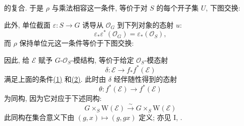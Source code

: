 的复合. 于是 \(\rho\) 与乘法相容这一条件,
等价于对 \(S\) 的每个开子集 \(U\), 下图交换:
\begin{center}
  \label{diag:sga3-VIB-11.6-1}%
  {\scriptsize
  }
\end{center}
此外, 单位截面 \(\varepsilon:S\to G\)
诱导从 \(\mathcal O_G\) 到下列对象的态射 \(u\):
\[
  \varepsilon_*\varepsilon^*(\mathcal O_G)
  =\varepsilon_*(\mathcal O_S),
\]
而 \(\rho\) 保持单位元这一条件等价于下图交换:
\begin{center}
  \label{diag:sga3-VIB-11.6-2}%
  {\small
  }
\end{center}

因此, 给 \(\mathcal E\) 赋予 \(G\)-\(\mathcal O_S\)-模结构,
等价于给定 \(\mathcal O_S\)-模态射
\[
  \delta:\mathcal E\longrightarrow f_*f^*(\mathcal E)
\]
满足上面的条件\hyperref[diag:sga3-VIB-11.6-1]{\textup{(1)}}
和\hyperref[diag:sga3-VIB-11.6-2]{\textup{(2)}}. 此时由 \(\delta\)
经伴随性得到的态射
\[
  \theta:f^*(\mathcal E)\longrightarrow f^*(\mathcal E)
\]
为同构, 因为它对应于下述同构:
\[
  G\times_S\mathrm W(\mathcal E)
    \xrightarrow{\ \sim\ }
  G\times_S\mathrm W(\mathcal E)
\]
此同构在集合意义下由 \((g,x)\longmapsto(g,gx)\) 定义;
亦见 I, .

